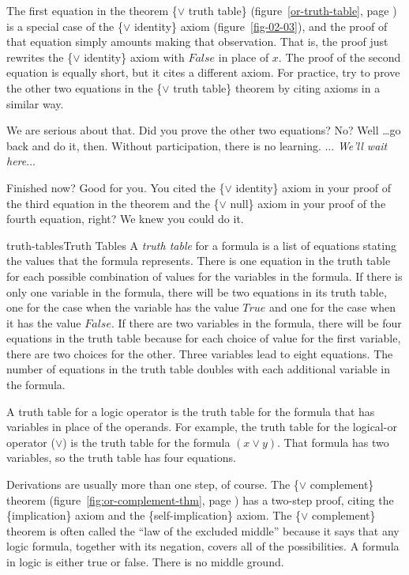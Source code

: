The first equation in the theorem \{$\vee$ truth table\}
(figure~\ref{or-truth-table}, page \pageref{or-truth-table})
is a special case of the
\{$\vee$ identity\} axiom (figure~\ref{fig-02-03}),
and the proof of that equation simply amounts making that observation.
That is, the proof just rewrites the \{$\vee$ identity\} axiom
with $False$ in place of $x$.
The proof of the second equation is equally short, but it cites
a different axiom.
For practice, try to prove the other two
equations in the \{$\vee$ truth table\} theorem
by citing axioms in a similar way.

We are serious about that. Did you prove the other two equations?
No? Well \dots go back and do it, then. Without participation, there
is no learning. $\dots$ \emph{We'll wait here}$\dots$

Finished now? Good for you. You cited the \{$\vee$ identity\} axiom in your
proof of the third equation in the theorem and the \{$\vee$ null\}
axiom in your proof of the fourth equation, right? We knew you could do it.

\begin{aside}{truth-tables}{Truth Tables}
A \emph{truth table} for a formula is a list of equations
stating the values that the formula represents.
There is one equation in the truth table for each possible
combination of values for the variables in the formula.
If there is only one variable in the formula,
there will be two equations in its truth table,
one for the case when the variable has the value
$True$ and one for the case when it has the value $False$.
If there are two variables in the formula,
there will be four equations in the truth table
because for each choice of value for the first variable,
there are two choices for the other.
Three variables lead to eight equations.
The number of equations in the truth table
doubles with each additional variable
in the formula.

A truth table for a logic operator is the truth table for the formula
that has variables in place of the operands.
For example, the truth table for the logical-or operator ($\vee$)
is the truth table for the formula $(x \vee y)$.
That formula has two variables, so the truth table has four equations.
\end{aside}

Derivations are usually more than one step, of course.
The \{$\vee$ complement\} theorem
(figure~\ref{fig:or-complement-thm}, page \pageref{fig:or-complement-thm})
has a two-step proof, citing the \{implication\} axiom
and the \{self-implication\} axiom.
The \{$\vee$ complement\} theorem is often called the
``law of the excluded middle''
because it says that any logic formula,
together with its negation, covers all of the possibilities.
A formula in logic is either true or false.
There is no middle ground.

